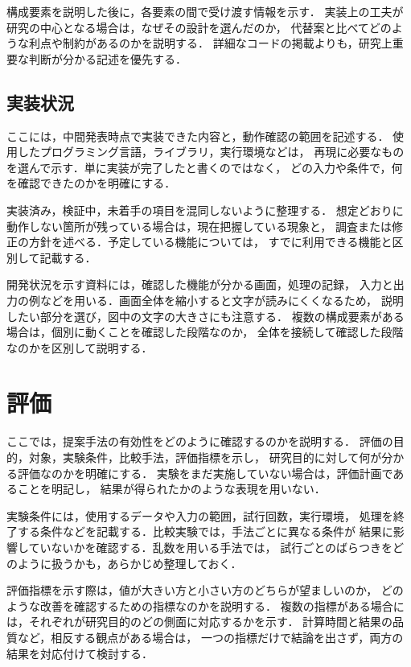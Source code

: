 \documentclass[10pt,twocolumn]{ltjsarticle}
\begin{document}
構成要素を説明した後に，各要素の間で受け渡す情報を示す．
実装上の工夫が研究の中心となる場合は，なぜその設計を選んだのか，
代替案と比べてどのような利点や制約があるのかを説明する．
詳細なコードの掲載よりも，研究上重要な判断が分かる記述を優先する．

\subsection{実装状況}
\label{sec:implementation}

ここには，中間発表時点で実装できた内容と，動作確認の範囲を記述する．
使用したプログラミング言語，ライブラリ，実行環境などは，
再現に必要なものを選んで示す．単に実装が完了したと書くのではなく，
どの入力や条件で，何を確認できたのかを明確にする．

実装済み，検証中，未着手の項目を混同しないように整理する．
想定どおりに動作しない箇所が残っている場合は，現在把握している現象と，
調査または修正の方針を述べる．予定している機能については，
すでに利用できる機能と区別して記載する．

開発状況を示す資料には，確認した機能が分かる画面，処理の記録，
入力と出力の例などを用いる．画面全体を縮小すると文字が読みにくくなるため，
説明したい部分を選び，図中の文字の大きさにも注意する．
複数の構成要素がある場合は，個別に動くことを確認した段階なのか，
全体を接続して確認した段階なのかを区別して説明する．

\section{評価}
\label{sec:evaluation}

ここでは，提案手法の有効性をどのように確認するのかを説明する．
評価の目的，対象，実験条件，比較手法，評価指標を示し，
研究目的に対して何が分かる評価なのかを明確にする．
実験をまだ実施していない場合は，評価計画であることを明記し，
結果が得られたかのような表現を用いない．

実験条件には，使用するデータや入力の範囲，試行回数，実行環境，
処理を終了する条件などを記載する．比較実験では，手法ごとに異なる条件が
結果に影響していないかを確認する．乱数を用いる手法では，
試行ごとのばらつきをどのように扱うかも，あらかじめ整理しておく．

評価指標を示す際は，値が大きい方と小さい方のどちらが望ましいのか，
どのような改善を確認するための指標なのかを説明する．
複数の指標がある場合には，それぞれが研究目的のどの側面に対応するかを示す．
計算時間と結果の品質など，相反する観点がある場合は，
一つの指標だけで結論を出さず，両方の結果を対応付けて検討する．
\end{document}
